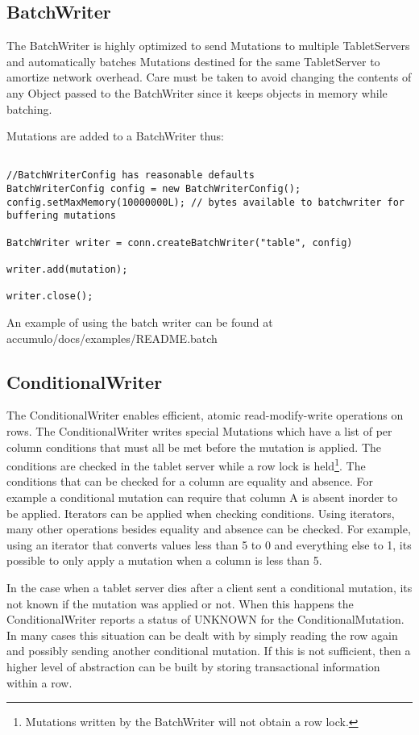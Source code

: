 \subsection{BatchWriter}
The BatchWriter is highly optimized to send Mutations to multiple TabletServers
and automatically batches Mutations destined for the same TabletServer to
amortize network overhead. Care must be taken to avoid changing the contents of
any Object passed to the BatchWriter since it keeps objects in memory while
batching.

Mutations are added to a BatchWriter thus:

\small
\begin{verbatim}

//BatchWriterConfig has reasonable defaults
BatchWriterConfig config = new BatchWriterConfig();
config.setMaxMemory(10000000L); // bytes available to batchwriter for buffering mutations

BatchWriter writer = conn.createBatchWriter("table", config)

writer.add(mutation);

writer.close();
\end{verbatim}
\normalsize

An example of using the batch writer can be found at\\
accumulo/docs/examples/README.batch

\subsection{ConditionalWriter} 
The ConditionalWriter enables efficient, atomic read-modify-write operations on
rows.  The ConditionalWriter writes special Mutations which have a list of per
column conditions that must all be met before the mutation is applied.  The
conditions are checked in the tablet server while a row lock is
held\footnote{Mutations written by the BatchWriter will not obtain a row
lock.}.  The conditions that can be checked for a column are equality and
absence.  For example a conditional mutation can require that column A is
absent inorder to be applied.  Iterators can be applied when checking
conditions.  Using iterators, many other operations besides equality and
absence can be checked.  For example, using an iterator that converts values
less than 5 to 0 and everything else to 1, its possible to only apply a
mutation when a column is less than 5.

In the case when a tablet server dies after a client sent a conditional
mutation, its not known if the mutation was applied or not.  When this happens
the ConditionalWriter reports a status of UNKNOWN for the ConditionalMutation.
In many cases this situation can be dealt with by simply reading the row again
and possibly sending another conditional mutation.  If this is not sufficient,
then a higher level of abstraction can be built by storing transactional
information within a row.
 
